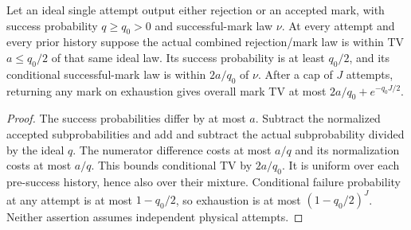\begin{lemma}\label{lem:accept}
Let an ideal single attempt output either rejection or an accepted mark,
with success probability $q\ge q_0>0$ and successful-mark law $\nu$.
At every attempt and every prior history suppose the actual combined
rejection/mark law is within TV $a\le q_0/2$ of that same ideal law.
Its success probability is at least $q_0/2$, and its conditional
successful-mark law is within $2a/q_0$ of $\nu$.
After a cap of $J$ attempts, returning any mark on exhaustion gives
overall mark TV at most $2a/q_0+e^{-q_0J/2}$.
\end{lemma}
\begin{proof}
The success probabilities differ by at most $a$. Subtract the normalized
accepted subprobabilities and add and subtract the actual subprobability
divided by the ideal $q$. The numerator difference costs at most $a/q$
and its normalization costs at most $a/q$. This bounds conditional TV
by $2a/q_0$. It is uniform over each pre-success history, hence also
over their mixture. Conditional failure probability at any attempt is at
most $1-q_0/2$, so exhaustion is at most $(1-q_0/2)^J$.
Neither assertion assumes independent physical attempts.
\end{proof}

